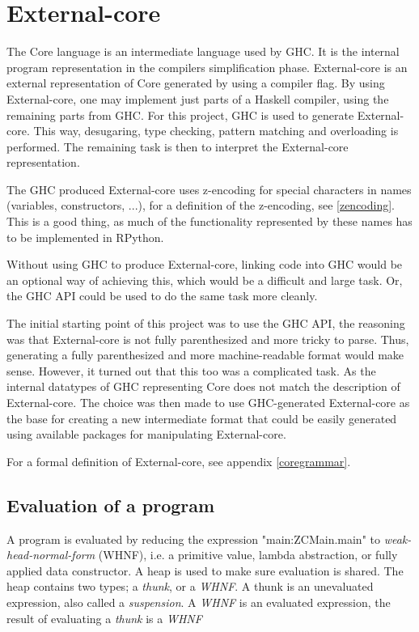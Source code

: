 
\section{External-core}


The Core language is an intermediate language used by GHC. It is the internal
program representation in the compilers simplification phase. External-core
is an external representation of Core generated by using a compiler flag. 
By using External-core, one
may implement just parts of a Haskell compiler, using the remaining parts from
GHC. For this project, GHC is used to generate External-core. This way, desugaring,
type checking, pattern matching and overloading is performed. The remaining task
is then to interpret the External-core representation. \cite{tolmach2010ghc}

The GHC produced External-core uses z-encoding for special characters in names 
(variables, constructors, ...), for
a definition of the z-encoding, see \ref{zencoding}. This is a good thing, as much
of the functionality represented by these names has to be implemented in RPython.

Without using GHC to produce External-core, linking code into GHC would be an 
optional way of achieving this, which would be a difficult and large task.
Or, the GHC API could be used to do the same task more cleanly. \cite{tolmach2010ghc}

The initial starting point of this project was to use the GHC API, the reasoning
was that External-core is not fully parenthesized and more tricky to parse. Thus,
generating a fully parenthesized and more machine-readable format would make sense.
However, it turned out that this too was a complicated task. As the internal
datatypes of GHC representing Core does not match the description of External-core. 
The choice was
then made to use GHC-generated External-core as the base for creating a new intermediate
format that could be easily generated using available packages for manipulating
External-core.

For a formal definition of External-core, see appendix \ref{coregrammar}.

\subsection{Evaluation of a program}

A program is evaluated by reducing the expression "main:ZCMain.main" to \emph{weak-head-normal-form} (WHNF),
i.e. a primitive value, lambda abstraction, or fully applied data constructor. A heap is used to make
sure evaluation is shared. The heap contains two types; a \emph{thunk}, or a \emph{WHNF}. A thunk is an unevaluated
expression, also called a \emph{suspension}. A \emph{WHNF} is an evaluated expression, the result of evaluating a \emph{thunk}
is a \emph{WHNF} \cite{tolmach2010ghc}



